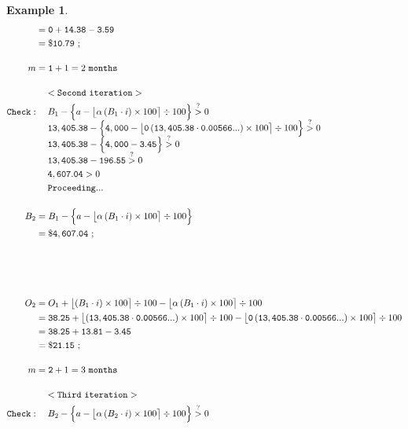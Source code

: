 \documentclass[12pt,letterpaper,oneside]{article}
\newtheorem{example}{Example}[section]
\theoremstyle{remark} %
\begin{document}
\begin{example}
\begin{align*}
	&=\mathtt{\interest}+\mathtt{14.38}-\mathtt{3.59}\\
	&=\mathtt{\$10.79}\ ;\\[12pt]
	m&=\mathtt{\monthsp}+1=2\mathtt{\ months}\\[12pt]
	&\quad\;\mathtt{<Second\ iteration>}\\
	\mathtt{Check:}&\quad\;B_{\monthsitb}-\Big\{a-\big\lfloor{\alpha\left(B_{\monthsitb}\cdot i\right)\times 100}\big\rceil\div 100\Big\}\overset{?}{>}0\\[-6pt]
	&\quad\;\mathtt{\balanceitb}-\Big\{\mathtt{\amount}-\big\lfloor{\mathtt{\proportion}\left(\mathtt{\balanceitb}\cdot \mathtt{\rate}\right)\times 100}\big\rceil\div 100\Big\}\overset{?}{>}0\\[-6pt]
	&\quad\;\mathtt{\balanceitb}-\Big\{\mathtt{\amount}-\mathtt{3.45}\Big\}\overset{?}{>}0\\[-6pt]
	&\quad\;\mathtt{\balanceitb}-\mathtt{196.55}\overset{?}{>}0\\
	&\quad\;\mathtt{4,607.04}>0\\
	&\quad\;\mathtt{Proceeding...}\\[12pt]
	B_{\monthspitb}&=B_{\monthsitb}-\Big\{a-\big\lfloor{\alpha\left(B_{\monthsitb}\cdot i\right)\times 100}\big\rceil\div 100\Big\}\\
	&=\mathtt{\$4,607.04}\ ;\\[60pt] %
	O_{\monthspitb}&=O_{\monthsitb}+\big\lfloor{\left(B_{\monthsitb}\cdot i\right)\times 100}\big\rceil\div 100-\big\lfloor{\alpha\left(B_{\monthsitb}\cdot i\right)\times 100}\big\rceil\div 100\\
	&=\mathtt{\interestitb}+\big\lfloor{\left(\mathtt{\balanceitb}\cdot \mathtt{\rate}\right)\times 100}\big\rceil\div 100-\big\lfloor{\mathtt{\proportion}\left(\mathtt{\balanceitb}\cdot \mathtt{\rate}\right)\times 100}\big\rceil\div 100\\
	&=\mathtt{\interestitb}+\mathtt{13.81}-\mathtt{3.45}\\
	&=\mathtt{\$21.15}\ ;\\[12pt]
	m&=\mathtt{\monthspitb}+1=3\mathtt{\ months}\\[12pt]
	&\quad\;\mathtt{<Third\ iteration>}\\
	\mathtt{Check:}&\quad\;B_{\monthsitc}-\Big\{a-\big\lfloor{\alpha\left(B_{\monthsitc}\cdot i\right)\times 100}\big\rceil\div 100\Big\}\overset{?}{>}0\\[-6pt]

\end{align*}
\end{example}
\end{document}
